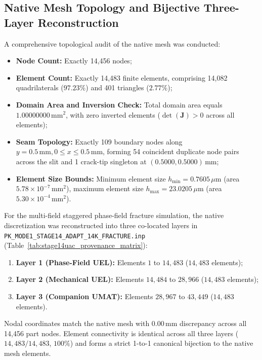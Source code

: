 \subsection{Native Mesh Topology and Bijective Three-Layer Reconstruction}
\label{subsec:stage14uac_topology_bijection}

A comprehensive topological audit of the native mesh was conducted:
\begin{itemize}
  \item \textbf{Node Count:} Exactly 14,456 nodes;
  \item \textbf{Element Count:} Exactly 14,483 finite elements, comprising 14,082 quadrilaterals ($97.23\%$) and 401 triangles ($2.77\%$);
  \item \textbf{Domain Area and Inversion Check:} Total domain area equals $1.00000000\,\mathrm{mm}^2$, with zero inverted elements ($\det(\boldsymbol{J}) > 0$ across all elements);
  \item \textbf{Seam Topology:} Exactly 109 boundary nodes along $y = 0.5\,\mathrm{mm}, 0 \le x \le 0.5\,\mathrm{mm}$, forming 54 coincident duplicate node pairs across the slit and 1 crack-tip singleton at $(0.5000, 0.5000)\,\mathrm{mm}$;
  \item \textbf{Element Size Bounds:} Minimum element size $h_{\min} = 0.7605\,\mu\mathrm{m}$ (area $5.78 \times 10^{-7}\,\mathrm{mm}^2$), maximum element size $h_{\max} = 23.0205\,\mu\mathrm{m}$ (area $5.30 \times 10^{-4}\,\mathrm{mm}^2$).
\end{itemize}

For the multi-field staggered phase-field fracture simulation, the native discretization was reconstructed into three co-located layers in \texttt{PK\_MODE1\_STAGE14\_ADAPT\_14K\_FRACTURE.inp} (Table~\ref{tab:stage14uac_provenance_matrix}):
\begin{enumerate}
  \item \textbf{Layer 1 (Phase-Field UEL):} Elements $1$ to $14{,}483$ ($14{,}483$ elements);
  \item \textbf{Layer 2 (Mechanical UEL):} Elements $14{,}484$ to $28{,}966$ ($14{,}483$ elements);
  \item \textbf{Layer 3 (Companion UMAT):} Elements $28{,}967$ to $43{,}449$ ($14{,}483$ elements).
\end{enumerate}
Nodal coordinates match the native mesh with $0.00\,\mathrm{mm}$ discrepancy across all 14,456 part nodes. Element connectivity is identical across all three layers ($14{,}483/14{,}483$, $100\%$) and forms a strict 1-to-1 canonical bijection to the native mesh elements.

